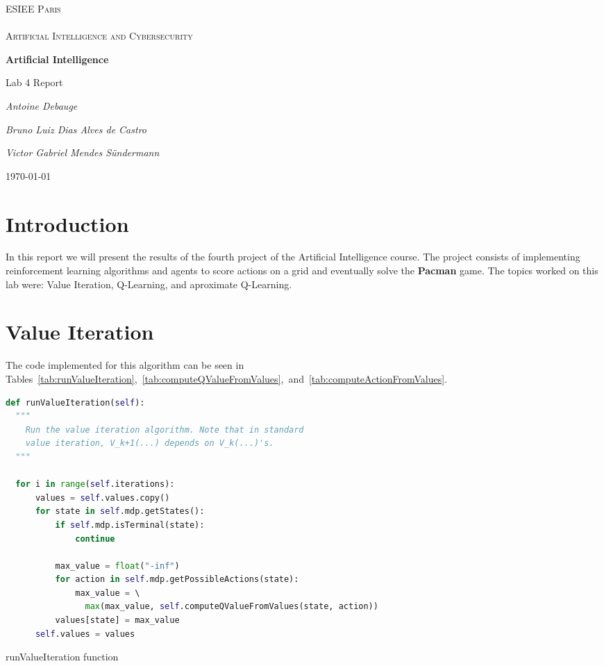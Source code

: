 \documentclass{article}
\begin{document}

\begin{titlepage}
\centering
{\textsc{\Large ESIEE Paris \\ ~\\ Artificial Intelligence and Cybersecurity} \par}
\vfill
{\huge\bfseries Artificial Intelligence \par}
\vspace{0.5cm}
{\LARGE Lab 4 Report \par}
\vspace{2cm}
{\Large\itshape Antoine Debauge \par}
{\Large\itshape Bruno Luiz Dias Alves de Castro \par}
{\Large\itshape Victor Gabriel Mendes Sündermann \par}
\vfill

{\large \today\par}
\end{titlepage}

\pagebreak
\tableofcontents
\pagebreak

\section{Introduction}

In this report we will present the results of the fourth project of the Artificial Intelligence course. The project consists of implementing reinforcement learning algorithms and agents to score actions on a grid and eventually solve the \textbf{Pacman} game.
The topics worked on this lab were: Value Iteration, Q-Learning, and aproximate Q-Learning.

\section{Value Iteration}
The code implemented for this algorithm can be seen in Tables~\ref{tab:runValueIteration},~\ref{tab:computeQValueFromValues},~and~\ref{tab:computeActionFromValues}.

\hbox{}

\begin{table} [ht!]
\begin{lstlisting}[language=python, frame=tlbr, framesep=6pt, backgroundcolor=\color{light-gray}]
def runValueIteration(self):
  """
    Run the value iteration algorithm. Note that in standard
    value iteration, V_k+1(...) depends on V_k(...)'s.
  """

  for i in range(self.iterations):
      values = self.values.copy()
      for state in self.mdp.getStates():
          if self.mdp.isTerminal(state):
              continue
              
          max_value = float("-inf")
          for action in self.mdp.getPossibleActions(state):
              max_value = \ 
                max(max_value, self.computeQValueFromValues(state, action))
          values[state] = max_value
      self.values = values
\end{lstlisting}
\caption{runValueIteration function}
\label{tab:runValueIteration}
\end{table}
\end{document}
